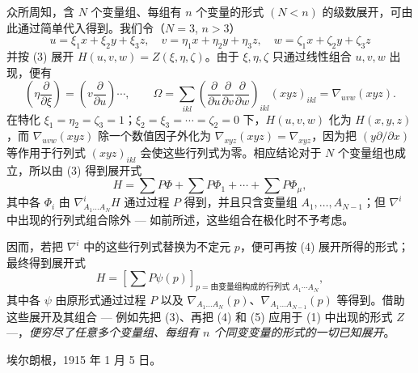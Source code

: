 \documentclass[11pt]{article}
\begin{document}
众所周知，含 $N$ 个变量组、每组有 $n$ 个变量的形式 $(N<n)$ 的级数展开，可由此通过简单代入得到。我们令（$N=3$, $n>3$）
\[
  u=\xi_1x+\xi_2y+\xi_3z,
  \quad v=\eta_1x+\eta_2y+\eta_3z,
  \quad w=\zeta_1x+\zeta_2y+\zeta_3z
\]
并按 (3) 展开 $H(u,v,w)=Z(\xi,\eta,\zeta)$。由于 $\xi,\eta,\zeta$ 只通过线性组合 $u,v,w$ 出现，便有
\[
  \left(\eta\frac{\partial}{\partial \xi}\right)=
  \left(v\frac{\partial}{\partial u}\right)\cdots,
  \qquad
  \Omega=\sum_{ikl}\left(\frac{\partial}{\partial u}
  \frac{\partial}{\partial v}
  \frac{\partial}{\partial w}\right)_{ikl}(xyz)_{ikl}
  =\nabla_{uvw}(xyz).
\]
在特化 $\xi_1=\eta_2=\zeta_3=1$；$\xi_2=\xi_3=\cdots=\zeta_2=0$ 下，$H(u,v,w)$ 化为 $H(x,y,z)$，而 $\nabla_{uvw}(xyz)$ 除一个数值因子外化为 $\nabla_{xyz}(xyz)=\nabla_{xyz}$，因为把 $(y\partial/\partial x)$ 等作用于行列式 $(xyz)_{ikl}$ 会使这些行列式为零。相应结论对于 $N$ 个变量组也成立，所以由 (3) 得到展开式
\begin{equation}
  H=\sum P\Phi+\sum P\Phi_1+\cdots+\sum P\Phi_\mu,
\tag{4}
\end{equation}
其中各 $\Phi_i$ 由 $\nabla^i_{A_1\ldots A_N}H$ 通过过程 $P$ 得到，并且只含变量组 $A_1,
\ldots,A_{N-1}$；但 $\nabla^i$ 中出现的行列式组合除外 --- 如前所述，这些组合在极化时不予考虑。

因而，若把 $\nabla^i$ 中的这些行列式替换为不定元 $p$，便可再按 (4) 展开所得的形式；最终得到展开式
\begin{equation}
  H=\left[\sum P\psi(p)\right]_{p=\text{由变量组构成的行列式 }A_1\cdots A_N},
\tag{5}
\end{equation}
其中各 $\psi$ 由原形式通过过程 $P$ 以及 $\nabla_{A_1\ldots A_N}(p)$、$\nabla_{A_1\ldots A_{N-1}}(p)$ 等得到。借助这些展开及其组合 --- 例如先把 (3)、再把 (4) 和 (5) 应用于 (1) 中出现的形式 $Z$ ---，\emph{便穷尽了任意多个变量组、每组有 $n$ 个同变变量的形式的一切已知展开}。

埃尔朗根，1915 年 1 月 5 日。



\clearpage
\setcounter{footnote}{0}
\end{document}
